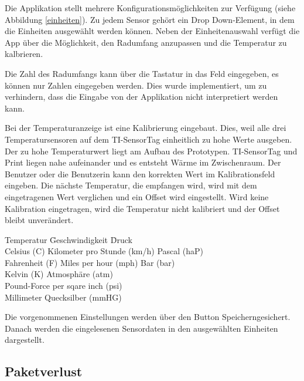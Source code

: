 Die Applikation stellt mehrere Konfigurationsmöglichkeiten zur Verfügung (siehe Abbildung \ref{einheiten}). Zu jedem Sensor gehört ein Drop Down-Element, in dem die Einheiten ausgewählt werden können. Neben der Einheitenauswahl verfügt die App über die Möglichkeit, den Radumfang anzupassen und die Temperatur zu kalbrieren. 

Die Zahl des Radumfangs kann über die Tastatur in das Feld eingegeben, es können nur Zahlen eingegeben werden. Dies wurde implementiert, um zu verhindern, dass die Eingabe von der Applikation nicht interpretiert werden kann.

Bei der Temperaturanzeige ist eine Kalibrierung eingebaut. Dies, weil alle drei Temperatursensoren auf dem TI-SensorTag einheitlich zu hohe Werte ausgeben. Der zu hohe Temperaturwert liegt am Aufbau des Prototypen. TI-SensorTag und Print liegen nahe aufeinander und es entsteht Wärme im Zwischenraum. Der Benutzer oder die Benutzerin kann den korrekten Wert im Kalibrationsfeld eingeben. Die nächste Temperatur, die empfangen wird, wird mit dem eingetragenen Wert verglichen und ein Offset wird eingestellt. Wird keine Kalibration eingetragen, wird die Temperatur nicht kalibriert und der Offset bleibt unverändert.

\begin{minipage}{\textwidth}
    \begin{tabbing}
    Temperatur     \quad\= Geschwindigkeit            \quad\= Druck \\[0.8ex]
    Celsius (C)    \> Kilometer pro Stunde (km/h)\> Pascal (haP)\\
    Fahrenheit (F) \> Miles per hour (mph)       \> Bar (bar)\\
    Kelvin (K)     \>                            \> Atmosph\"{a}re (atm)\\
                   \>                      \> Pound-Force per sqare inch (psi)\\
                   \>                      \> Millimeter Quecksilber (mmHG)\\
    \end{tabbing}
\end{minipage}
  
Die vorgenommenen Einstellungen werden über den Button \glqq Speichern\grqq gesichert. Danach werden die eingelesenen Sensordaten in den ausgewählten Einheiten dargestellt.

\subsection{Paketverlust}

